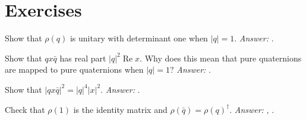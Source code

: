 \section*{Exercises}

\begin{exercise}
Show that $\rho(q)$ is unitary with determinant one when $|q|=1$. \emph{Answer:} .
\end{exercise}

\begin{exercise}
Show that $q x\bar q$ has real part $|q|^2\operatorname{Re}x$. Why does this mean that pure quaternions are mapped to pure quaternions when $|q|=1$? \emph{Answer:} .
\end{exercise}

\begin{exercise}
Show that $|qx\bar q|^2=|q|^4|x|^2$. \emph{Answer:} .
\end{exercise}

\begin{exercise}
Check that $\rho(1)$ is the identity matrix and $\rho(\bar q)=\rho(q)^\dagger$. \emph{Answer:} , .
\end{exercise}
